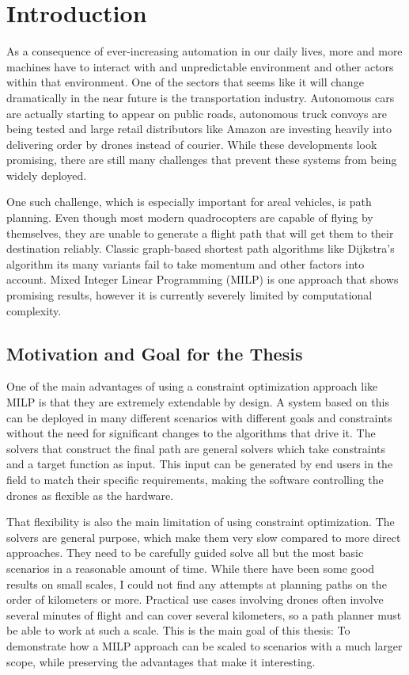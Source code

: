 \section{Introduction}
As a consequence of ever-increasing automation in our daily lives, more and more machines have to interact with and unpredictable environment and other actors within that environment. One of the sectors that seems like it will change dramatically in the near future is the transportation industry. Autonomous cars are actually starting to appear on public roads, autonomous truck convoys are being tested and large retail distributors like Amazon are investing heavily into delivering order by drones instead of courier. While these developments look promising, there are still many challenges that prevent these systems from being widely deployed.
\par
One such challenge, which is especially important for areal vehicles, is path planning. Even though most modern quadrocopters are capable of flying by themselves, they are unable to generate a flight path that will get them to their destination reliably. Classic graph-based shortest path algorithms like Dijkstra's algorithm its many variants fail to take momentum and other factors into account. Mixed Integer Linear Programming (MILP) is one approach that shows promising results, however it is currently severely limited by computational complexity.



\subsection{Motivation and Goal for the Thesis}
One of the main advantages of using a constraint optimization approach like MILP is that they are extremely extendable by design. A system based on this can be deployed in many different scenarios with different goals and constraints without the need for significant changes to the algorithms that drive it. The solvers that construct the final path are general solvers which take constraints and a target function as input. This input can be generated by end users in the field to match their specific requirements, making the software controlling the drones as flexible as the hardware.
\par
That flexibility is also the main limitation of using constraint optimization. The solvers are general purpose, which make them very slow compared to more direct approaches. They need to be carefully guided solve all but the most basic scenarios in a reasonable amount of time. While there have been some good results on small scales, I could not find any attempts at planning paths on the order of kilometers or more. Practical use cases involving drones often involve several minutes of flight and can cover several kilometers, so a path planner must be able to work at such a scale. This is the main goal of this thesis: To demonstrate how a MILP approach can be scaled to scenarios with a much larger scope, while preserving the advantages that make it interesting.
